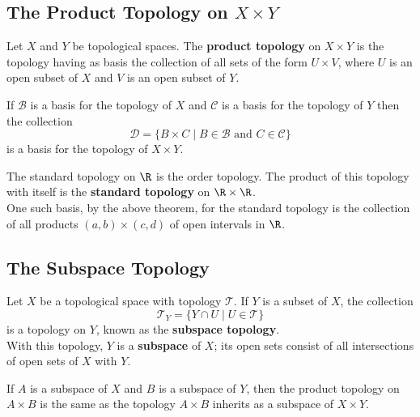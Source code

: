 \subsection{The Product Topology on $X \times Y$}
\begin{definition}
Let $X$ and $Y$ be topological spaces. The \textbf{product topology} on $X \times Y$ is the topology having as basis the collection
of all sets of the form $U \times V$, where $U$ is an open subset of $X$ and $V$ is an open subset of $Y$.
\end{definition}

\begin{theorem}
If $\mathscr{B}$ is a basis for the topology of $X$ and $\mathscr{C}$ is a basis for the topology of $Y$ then the collection
\[
    \mathscr{D} = \{ B \times C \mid B \in \mathscr{B} \text{ and } C \in \mathscr{C} \} 
\]
is a basis for the topology of $X \times Y$.
\end{theorem}

\begin{eg}
The standard topology on $\R$ is the order topology. The product of this topology with itself is the \textbf{standard topology} on $\R \times \R$. \\

One such basis, by the above theorem, for the standard topology is the collection of all products $(a, b) \times (c, d)$ of open intervals in $\R$.
\end{eg}

\subsection{The Subspace Topology}

\begin{definition}
Let $X$ be a topological space with topology $\mathscr{T}$. If $Y$ is a subset of $X$, the collection
\[
    \mathscr{T}_Y = \{ Y \cap U \mid U \in \mathscr{T} \} 
\]
is a topology on $Y$, known as the \textbf{subspace topology}. \\

With this topology, $Y$ is a \textbf{subspace} of $X$; its open sets consist of all intersections of open sets of $X$ with $Y$.
\end{definition}

\begin{theorem}
If $A$ is a subspace of $X$ and $B$ is a subspace of $Y$, then the product topology on $A \times B$ is the same as the topology $A \times B$ inherits as a subspace of $X \times Y$.
\end{theorem}

